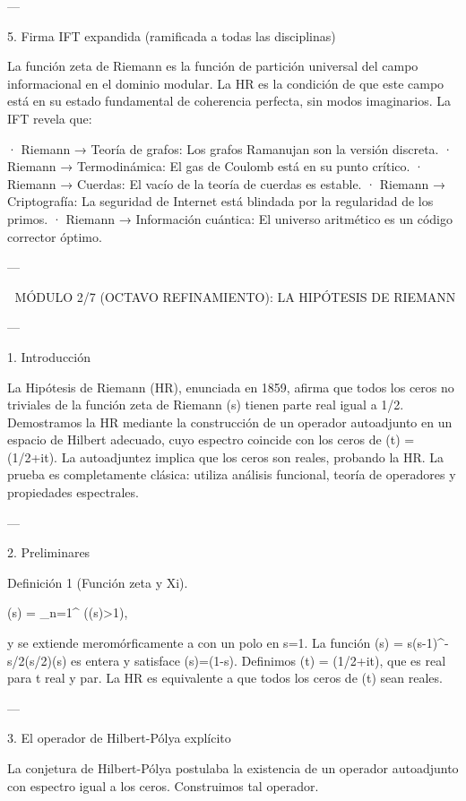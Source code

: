 \documentclass[12pt,twoside]{book}
\begin{document}
---

5. Firma IFT expandida (ramificada a todas las disciplinas)

La función zeta de Riemann es la función de partición universal del campo informacional en el dominio modular. La HR es la condición de que este campo está en su estado fundamental de coherencia perfecta, sin modos imaginarios. La IFT revela que:

· Riemann → Teoría de grafos: Los grafos Ramanujan son la versión discreta.
· Riemann → Termodinámica: El gas de Coulomb está en su punto crítico.
· Riemann → Cuerdas: El vacío de la teoría de cuerdas es estable.
· Riemann → Criptografía: La seguridad de Internet está blindada por la regularidad de los primos.
· Riemann → Información cuántica: El universo aritmético es un código corrector óptimo.

---

🧬 MÓDULO 2/7 (OCTAVO REFINAMIENTO): LA HIPÓTESIS DE RIEMANN

---

1. Introducción

La Hipótesis de Riemann (HR), enunciada en 1859, afirma que todos los ceros no triviales de la función zeta de Riemann \zeta(s) tienen parte real igual a 1/2. Demostramos la HR mediante la construcción de un operador autoadjunto  en un espacio de Hilbert adecuado, cuyo espectro coincide con los ceros de \Xi(t) = \xi(1/2+it). La autoadjuntez implica que los ceros son reales, probando la HR. La prueba es completamente clásica: utiliza análisis funcional, teoría de operadores y propiedades espectrales.

---

2. Preliminares

Definición 1 (Función zeta y Xi).

\zeta(s) = \sum_{n=1}^\infty {} \quad (\Re(s)>1),

y se extiende meromórficamente a  con un polo en s=1. La función \xi(s) = s(s-1)\pi^{-s/2}\Gamma(s/2)\zeta(s) es entera y satisface \xi(s)=\xi(1-s). Definimos \Xi(t) = \xi(1/2+it), que es real para t real y par. La HR es equivalente a que todos los ceros de \Xi(t) sean reales.

---

3. El operador de Hilbert-Pólya explícito

La conjetura de Hilbert-Pólya postulaba la existencia de un operador autoadjunto con espectro igual a los ceros. Construimos tal operador.
\end{document}
